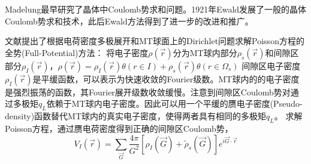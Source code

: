 
Madelung\cite{PZ19-524_1918}最早研究了晶体中Coulomb势求和问题。1921年Ewald\cite{AP64-253_1921}发展了一般的晶体Coulomb势求和技术，此后Ewald方法得到了进一步的改进和推广\cite{Tosi,PR117-1466_1960,PR181-1020_1969}。

文献\cite{JMP22-2433_1981}提出了根据电荷密度多极展开和MT球面上的Dirichlet问题求解Poisson方程的全势(Full-Potential)方法：
将电子密度$\rho(\vec r)$分为MT球内部分$\rho_s(\vec r)$和间隙区部分$\rho_I(\vec r)$，$\rho(\vec r)=\rho_I(\vec r)\theta(r\in I)+\rho_s(\vec r)\theta(r\in \Omega_s)$
间隙区电子密度$\rho_I(\vec r)$是平缓函数，可以表示为快速收敛的Fourier级数。MT球内的的电子密度是强烈振荡的函数，其Fourier展开级数收敛缓慢。注意到间隙区Coulomb势对通过多极矩$q_L$依赖于MT球内电子密度\cite{Landau-Lifshitz}。因此可以用一个平缓的赝电子密度(Pseudo-density)函数替代MT球内的真实电子密度，使得两者具有相同的多极矩$q_L$。%
求解Poisson方程，通过赝电荷密度得到正确的间隙区Coulomb势，
\begin{equation}
  V_I(\vec r)=\sum_{\vec G}\frac{4\pi}{G^2}[\rho_I(\vec G)+\tilde\rho_s(\vec G)]e^{i\vec G\cdot\vec r}
  \label{eq:solid-70}
\end{equation}

